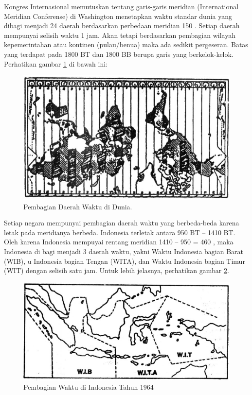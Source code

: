  Kongres Internasional memutuskan tentang garis-garis meridian (International Meridian Conferense) 
 di Washington menetapkan waktu standar dunia yang dibagi menjadi 24 daerah berdasarkan
 perbedaan meridian 150 . Setiap daerah mempunyai selisih waktu 1 jam.
 Akan tetapi berdasarkan pembagian wilayah kepemerintahan atau kontinen (pulau/benua)
 maka ada sedikit pergeseran. Batas yang terdapat pada 1800 BT dan 1800 BB berupa garis
 yang berkelok-kelok. Perhatikan gambar \ref{sejarahwaktu_Capture1} di bawah ini:
 
 \begin{figure}[ht]
 \centerline{\includegraphics[width=1\textwidth]{figures/sejarahwaktu_dunia}}
 \caption{Pembagian Daerah Waktu di Dunia.}
 \label{sejarahwaktu_Capture1}
 \end{figure}
 
 
Setiap negara mempunyai pembagian daerah waktu yang berbeda-beda karena letak pada meridianya berbeda. 
 Indonesia terletak antara 950 BT – 1410 BT. Oleh karena Indonesia mempuyai rentang meridian 1410 – 950 = 460 , 
 maka Indonesia di bagi menjadi 3 daerah waktu, yakni Waktu Indonesia bagian Barat (WIB),
 u Indonesia bagian Tengan (WITA), dan Waktu Indonesia bagian Timur (WIT) dengan selisih
 satu jam. Untuk lebih jelasnya,  perhatikan gambar \ref{sejarahwaktu_Capture2}.
 
 \begin{figure}[ht]
 \centerline{\includegraphics[width=1\textwidth]{figures/sejarahwaktu_indo64}}
 \caption{Pembagian Waktu di Indonesia Tahun 1964}
 \label{sejarahwaktu_Capture2}
 \end{figure}
 

